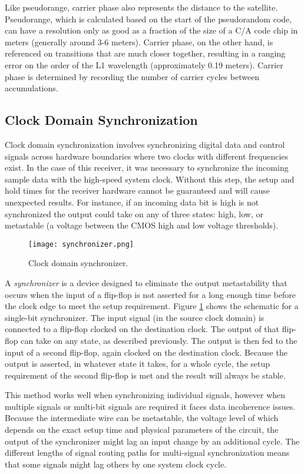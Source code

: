\documentclass[12pt]{article}
\begin{document}
Like pseudorange, carrier phase also represents the distance to the satellite. Pseudorange, which is calculated based on the start of the pseudorandom code, can have a resolution only as good as a fraction of the size of a C/A code chip in meters (generally around 3-6 meters). Carrier phase, on the other hand, is referenced on transitions that are much closer together, resulting in a ranging error on the order of the L1 wavelength (approximately 0.19 meters). Carrier phase is determined by recording the number of carrier cycles between accumulations.

\subsection{Clock Domain Synchronization}
Clock domain synchronization involves synchronizing digital data and control signals across hardware boundaries where two clocks with different frequencies exist. In the case of this receiver, it was necessary to synchronize the incoming sample data with the high-speed system clock. Without this step, the setup and hold times for the receiver hardware cannot be guaranteed and will cause unexpected results. For instance, if an incoming data bit is high is not synchronized the output could take on any of three states: high, low, or metastable (a voltage between the CMOS high and low voltage thresholds).

\begin{figure}
\centering
\texttt{[image: synchronizer.png]}
\caption{Clock domain synchronizer.}
\label{img:synchronizer}
\end{figure}

A \emph{synchronizer} is a device designed to eliminate the output metastability that occurs when the input of a flip-flop is not asserted for a long enough time before the clock edge to meet the setup requirement. Figure \ref{img:synchronizer} shows the schematic for a single-bit synchronizer. The input signal (in the source clock domain) is connected to a flip-flop clocked on the destination clock. The output of that flip-flop can take on any state, as described previously. The output is then fed to the input of a second flip-flop, again clocked on the destination clock. Because the output is asserted, in whatever state it takes, for a whole cycle, the setup requirement of the second flip-flop is met and the result will always be stable.

This method works well when synchronizing individual signals, however when multiple signals or multi-bit signals are required it faces data incoherence issues. Because the intermediate wire can be metastable, the voltage level of which depends on the exact setup time and physical parameters of the circuit, the output of the synchronizer might lag an input change by an additional cycle. The different lengths of signal routing paths for multi-signal synchronization means that some signals might lag others  by one system clock cycle.
\end{document}
